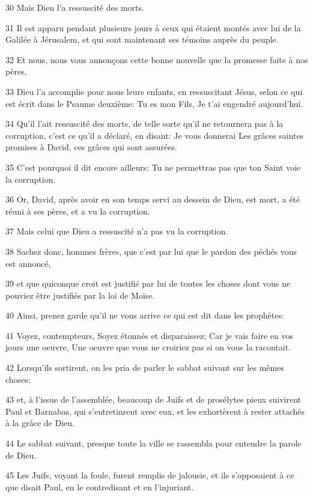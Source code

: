 \par 30 Mais Dieu l'a ressuscité des morts.
\par 31 Il est apparu pendant plusieurs jours à ceux qui étaient montés avec lui de la Galilée à Jérusalem, et qui sont maintenant ses témoins auprès du peuple.
\par 32 Et nous, nous vous annonçons cette bonne nouvelle que la promesse faite à nos pères,
\par 33 Dieu l'a accomplie pour nous leurs enfants, en ressuscitant Jésus, selon ce qui est écrit dans le Psaume deuxième: Tu es mon Fils, Je t'ai engendré aujourd'hui.
\par 34 Qu'il l'ait ressuscité des morts, de telle sorte qu'il ne retournera pas à la corruption, c'est ce qu'il a déclaré, en disant: Je vous donnerai Les grâces saintes promises à David, ces grâces qui sont assurées.
\par 35 C'est pourquoi il dit encore ailleurs: Tu ne permettras pas que ton Saint voie la corruption.
\par 36 Or, David, après avoir en son temps servi au dessein de Dieu, est mort, a été réuni à ses pères, et a vu la corruption.
\par 37 Mais celui que Dieu a ressuscité n'a pas vu la corruption.
\par 38 Sachez donc, hommes frères, que c'est par lui que le pardon des péchés vous est annoncé,
\par 39 et que quiconque croit est justifié par lui de toutes les choses dont vous ne pouviez être justifiés par la loi de Moïse.
\par 40 Ainsi, prenez garde qu'il ne vous arrive ce qui est dit dans les prophètes:
\par 41 Voyez, contempteurs, Soyez étonnés et disparaissez; Car je vais faire en vos jours une oeuvre, Une oeuvre que vous ne croiriez pas si on vous la racontait.
\par 42 Lorsqu'ils sortirent, on les pria de parler le sabbat suivant sur les mêmes choses;
\par 43 et, à l'issue de l'assemblée, beaucoup de Juifs et de prosélytes pieux suivirent Paul et Barnabas, qui s'entretinrent avec eux, et les exhortèrent à rester attachés à la grâce de Dieu.
\par 44 Le sabbat suivant, presque toute la ville se rassembla pour entendre la parole de Dieu.
\par 45 Les Juifs, voyant la foule, furent remplis de jalousie, et ils s'opposaient à ce que disait Paul, en le contredisant et en l'injuriant.
